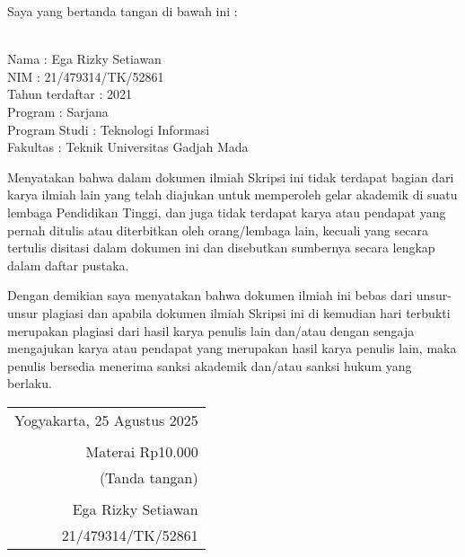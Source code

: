 \noindent Saya yang bertanda tangan di bawah ini :

\vspace{-1em}

\begin{tabbing}
	\hspace{40mm} \= \\ %
	\noindent Nama \> : Ega Rizky Setiawan\\[\parskip]
	\noindent NIM \> : 21/479314/TK/52861 \\[\parskip]
	\noindent Tahun terdaftar \> : 2021 \\[\parskip]
	\noindent Program \> : Sarjana \\[\parskip]
	\noindent Program Studi \> : Teknologi Informasi \\[\parskip]
	\noindent Fakultas \> : Teknik Universitas Gadjah Mada
\end{tabbing}

\noindent Menyatakan bahwa dalam dokumen ilmiah Skripsi ini tidak terdapat bagian dari karya ilmiah lain yang telah diajukan untuk memperoleh gelar akademik di suatu lembaga Pendidikan Tinggi, dan juga tidak terdapat karya atau pendapat yang pernah ditulis atau diterbitkan oleh orang/lembaga lain, kecuali yang secara tertulis disitasi dalam dokumen ini dan disebutkan sumbernya secara lengkap dalam daftar pustaka.

\noindent Dengan demikian saya menyatakan bahwa dokumen ilmiah ini bebas dari unsur-unsur plagiasi dan apabila dokumen ilmiah Skripsi ini di kemudian hari terbukti merupakan plagiasi dari hasil karya penulis lain dan/atau dengan sengaja mengajukan karya atau pendapat yang merupakan hasil karya penulis lain, maka penulis bersedia menerima sanksi akademik dan/atau sanksi hukum yang berlaku.


\begin{flushright}
	\begin{tabular}{r}
		Yogyakarta, 25 Agustus 2025 \\
		\vspace{0.1cm}              \\
		\tiny{Materai Rp10.000}     \\
		\tiny{(Tanda tangan)}       \\
		\vspace{0.1cm}              \\
		Ega Rizky Setiawan          \\ 21/479314/TK/52861
	\end{tabular}
\end{flushright}